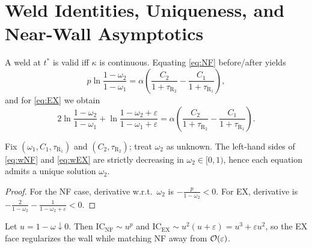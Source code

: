 \documentclass[onecolumn,amsmath,amssymb,aps]{revtex4-2}
\newcommand{\eps}{\varepsilon}
\newcommand{\kappaL}{\kappa}
\newcommand{\IC}{\mathrm{IC}}
\newcommand{\TauR}{\tau_\mathrm{R}}
\newcommand{\om}{\omega}
\newcommand{\Curv}{C}
\newcommand{\alp}{\alpha}
\begin{document}
\section{Weld Identities, Uniqueness, and Near-Wall Asymptotics}\label{sec:welds}
\begin{theorem}\label{thm:weld}
A weld at $t^\ast$ is valid iff $\kappaL$ is continuous. Equating \eqref{eq:NF} before/after yields
\begin{equation}\label{eq:wNF}
p\ln\frac{1-\om_2}{1-\om_1}=\alp\!\left(\frac{\Curv_2}{1+\TauR_2}-\frac{\Curv_1}{1+\TauR_1}\right),
\end{equation}
and for \eqref{eq:EX} we obtain
\begin{equation}\label{eq:wEX}
2\ln\frac{1-\om_2}{1-\om_1}+\ln\frac{1-\om_2+\eps}{1-\om_1+\eps}
=\alp\!\left(\frac{\Curv_2}{1+\TauR_2}-\frac{\Curv_1}{1+\TauR_1}\right).
\end{equation}
\end{theorem}
\begin{proposition}\label{prop:mono}
Fix $(\om_1,\Curv_1,\TauR_1)$ and $(\Curv_2,\TauR_2)$; treat $\om_2$ as unknown. The left-hand sides of \eqref{eq:wNF} and \eqref{eq:wEX} are strictly decreasing in $\om_2\in[0,1)$, hence each equation admits a unique solution $\om_2$.
\end{proposition}
\begin{proof}
For the NF case, derivative w.r.t.\ $\om_2$ is $-\frac{p}{1-\om_2}<0$. For EX, derivative is $-\frac{2}{1-\om_2}-\frac{1}{1-\om_2+\eps}<0$.
\end{proof}

\begin{lemma}\label{lem:wall}
Let $u=1-\om\downarrow 0$. Then
$\IC_{\mathrm{NF}}\sim u^{p}$ and
$\IC_{\mathrm{EX}}\sim u^{2}(u+\eps)=u^{3}+\eps u^{2}$, so the EX face regularizes the wall while matching NF away from $\order{\eps}$.
\end{lemma}
\end{document}
